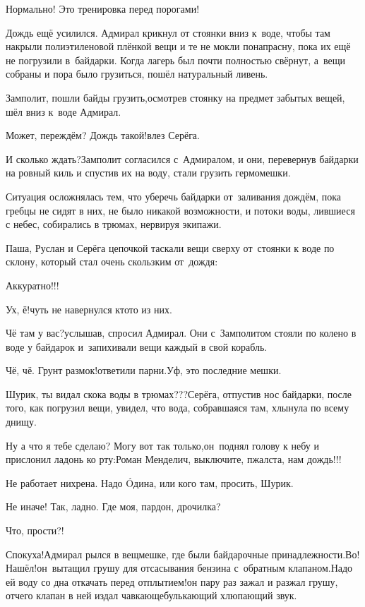 \diagdash Нормально! Это тренировка перед порогами!


Дождь ещё усилился. Адмирал крикнул от стоянки вниз к~воде, чтобы там накрыли полиэтиленовой плёнкой вещи и те не мокли понапрасну, пока их ещё не погрузили в~байдарки. Когда лагерь был почти полностью свёрнут, а~вещи собраны и пора было грузиться, пошёл натуральный ливень.

\diagdash Замполит, пошли байды грузить,\mdash осмотрев стоянку на предмет забытых вещей, шёл вниз к~воде Адмирал.

\diagdash Может, переждём? Дождь такой!\mdash влез Серёга.

\diagdash И сколько ждать?\mdash Замполит согласился с~Адмиралом, и они, перевернув байдарки на ровный киль и спустив их на воду, стали грузить гермомешки. 

Ситуация осложнялась тем, что уберечь байдарки от~заливания дождём, пока гребцы не сидят в них, не было никакой возможности, и потоки воды, лившиеся с небес, собирались в трюмах, нервируя экипажи.

Паша, Руслан и Серёга цепочкой таскали вещи сверху от~стоянки к воде по склону, который стал очень скользким от~дождя:

\diagdash Аккуратно!!!

\diagdash Ух, ё!\mdash чуть не навернулся кто\sdash то из них.

\diagdash Чё там у вас?\mdash услышав, спросил Адмирал. Они с~Замполитом стояли по колено в воде у байдарок и~запихивали вещи каждый в свой корабль.

\diagdash Чё, чё. Грунт размок!\mdash ответили парни.\mdash Уф, это последние мешки.

\diagdash Шурик, ты видал скока воды в трюмах???\mdash Серёга, отпустив нос байдарки, после того, как погрузил вещи, увидел, что вода, собравшаяся там, хлынула по всему днищу.

\diagdash Ну а что я тебе сделаю? Могу вот так только,\mdash он~поднял голову к небу и прислонил ладонь ко рту:\mdash Роман Менделич, выключите, п\sdash жалста, нам дождь!!!

\diagdash Не работает нихрена. Надо {\'{O}}дина, или кого там, просить, Шурик.

\diagdash Не иначе! Так, ладно. Где моя, пардон, дрочилка?

\diagdash Что, прости?!

\diagdash Спокуха!\mdash Адмирал рылся в вещмешке, где были байдарочные принадлежности.\mdash Во! Нашёл!\mdash он~вытащил грушу для отсасывания бензина с~обратным клапаном.\mdash Надо ей воду со дна откачать перед отплытием!\mdash он пару раз зажал и разжал грушу, отчего клапан в ней издал чавкающе\sdash булькающий хлюпающий звук.

